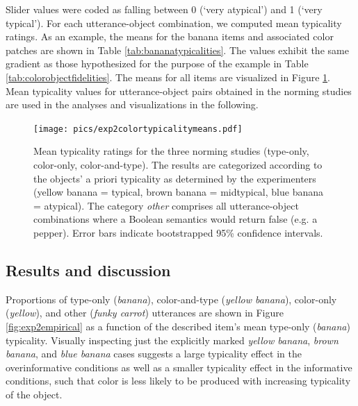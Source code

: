 \documentclass[11pt]{article}
\newcommand{\ndg}[1]{\textcolor{Green}{[ndg: #1]}}
\newcommand{\tableref}[1]{Table \ref{#1}}
\newcommand{\figref}[1]{Figure \ref{#1}}
\begin{document}
Slider values were coded as falling between 0 (`very atypical') and 1 (`very typical'). 
For each utterance-object combination, we computed mean typicality ratings. 
As an example, the means for the banana items and associated color patches are shown in \tableref{tab:bananatypicalities}. 
The values exhibit the same gradient as those hypothesized for the purpose of the example in \tableref{tab:colorobjectfidelities}. 
The means for all items are visualized in \figref{fig:exp2colortypicalitymeans}.
Mean typicality values for utterance-object pairs obtained in the norming studies are used in the analyses and visualizations in the following.

\begin{figure}
	\centering
	\texttt{[image: pics/exp2colortypicalitymeans.pdf]}
	\caption{Mean typicality ratings for the three norming studies (type-only, color-only, color-and-type). The results are categorized according to the objects' a priori typicality as determined by the experimenters (yellow banana = typical, brown banana = midtypical, blue banana = atypical). The category \emph{other} comprises all utterance-object combinations where a Boolean semantics would return false (e.g. a pepper). Error bars indicate bootstrapped 95\% confidence intervals.}
	\label{fig:exp2colortypicalitymeans}
\end{figure}


\subsection{Results and discussion}
\label{sec:exp2resultsdisc}

Proportions of type-only (\emph{banana}), color-and-type (\emph{yellow banana}), color-only (\emph{yellow}), and other (\emph{funky carrot}) utterances are shown in \figref{fig:exp2empirical} as a function of the described item's mean type-only (\emph{banana}) typicality. Visually inspecting just the explicitly marked \emph{yellow banana}, \emph{brown banana}, and \emph{blue banana} cases suggests a large typicality effect in the overinformative conditions as well as a smaller typicality effect in the informative conditions, such that color is less likely to be produced with increasing typicality of the object. 
\end{document}
